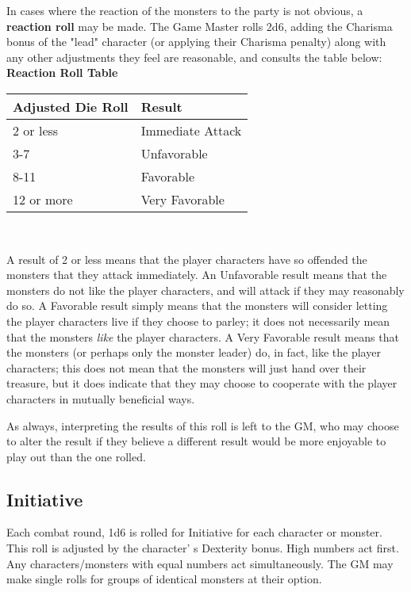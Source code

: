 \documentclass[a4paper,twoside,openany,10pt]{book}
\begin{document}
\begin{multicols}{2}
In cases where the reaction of the monsters to the party is not obvious, a \textbf{reaction roll} may be made. The Game Master rolls 2d6, adding the Charisma bonus of the "lead" character (or applying their Charisma penalty) along with any other adjustments they feel are reasonable, and consults the table below:\\

\textbf{Reaction Roll Table}\\\medskip

\begin{tabular*}{0.93\linewidth}{@{\extracolsep{\fill}}ll}
\textbf{Adjusted Die Roll} & \textbf{Result} \\\toprule
2 or less & Immediate Attack \\\hline
3-7 & Unfavorable \\\hline
8-11 & Favorable \\\hline
12 or more & Very Favorable \\\bottomrule
\end{tabular*}\\\medskip

A result of 2 or less means that the player characters have so offended the monsters that they attack immediately. An Unfavorable result means that the monsters do not like the player characters, and will attack if they may reasonably do so. A Favorable result simply means that the monsters will consider letting the player characters live if they choose to parley; it does not necessarily mean that the monsters \emph{like} the player characters. A Very Favorable result means that the monsters (or perhaps only the monster leader) do, in fact, like the player characters; this does not mean that the monsters will just hand over their treasure, but it does indicate that they may choose to cooperate with the player characters in mutually beneficial ways.

As always, interpreting the results of this roll is left to the GM, who may choose to alter the result if they believe a different result would be more enjoyable to play out than the one rolled.

\subsection{Initiative}\label{initiative}

Each combat round, 1d6 is rolled for Initiative for each character or monster. This roll is adjusted by the character' s Dexterity bonus. High numbers act first. Any characters/monsters with equal numbers act simultaneously. The GM may make single rolls for groups of identical monsters at their option.


\end{multicols}
\end{document}
